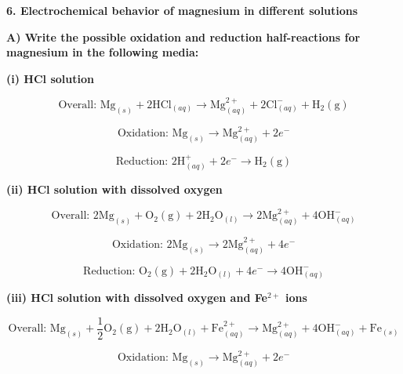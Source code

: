 \vspace{0.5cm}

\textbf{6. Electrochemical behavior of magnesium in different solutions}

\textbf{A) Write the possible oxidation and reduction half-reactions for magnesium in the following media:}

\vspace{0.3cm}
\textbf{(i) HCl solution}



\[
\text{Overall: } \mathrm{Mg}_{(s)} + 2\mathrm{HCl}_{(aq)} \rightarrow \mathrm{Mg}^{2+}_{(aq)} + 2\mathrm{Cl}^{-}_{(aq)} + \mathrm{H}_2\mathrm{(g)}
\]




\[
\text{Oxidation: } \mathrm{Mg}_{(s)} \rightarrow \mathrm{Mg}^{2+}_{(aq)} + 2e^-
\]




\[
\text{Reduction: } 2\mathrm{H}^{+}_{(aq)} + 2e^- \rightarrow \mathrm{H}_2\mathrm{(g)}
\]



\vspace{0.3cm}
\textbf{(ii) HCl solution with dissolved oxygen}



\[
\text{Overall: } 2\mathrm{Mg}_{(s)} + \mathrm{O}_2\mathrm{(g)} + 2\mathrm{H}_2\mathrm{O}_{(l)} \rightarrow 2\mathrm{Mg}^{2+}_{(aq)} + 4\mathrm{OH}^{-}_{(aq)}
\]




\[
\text{Oxidation: } 2\mathrm{Mg}_{(s)} \rightarrow 2\mathrm{Mg}^{2+}_{(aq)} + 4e^-
\]




\[
\text{Reduction: } \mathrm{O}_2\mathrm{(g)} + 2\mathrm{H}_2\mathrm{O}_{(l)} + 4e^- \rightarrow 4\mathrm{OH}^{-}_{(aq)}
\]



\vspace{0.3cm}
\textbf{(iii) HCl solution with dissolved oxygen and Fe\(^{2+}\) ions}



\[
\text{Overall: } \mathrm{Mg}_{(s)} + \frac{1}{2}\mathrm{O}_2\mathrm{(g)} + 2\mathrm{H}_2\mathrm{O}_{(l)} + \mathrm{Fe}^{2+}_{(aq)} \rightarrow \mathrm{Mg}^{2+}_{(aq)} + 4\mathrm{OH}^{-}_{(aq)} + \mathrm{Fe}_{(s)}
\]




\[
\text{Oxidation: } \mathrm{Mg}_{(s)} \rightarrow \mathrm{Mg}^{2+}_{(aq)} + 2e^-
\]




